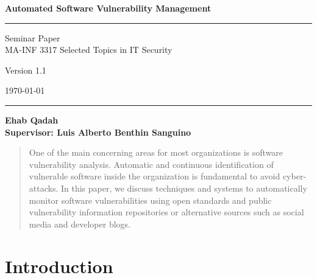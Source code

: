 \documentclass{llncs}
\begin{document}
\begin{flushleft}
 
 \thispagestyle{empty}
\centering\LARGE {\bf Automated Software Vulnerability Management}


\rule{\textwidth}{1pt}

\vspace{2pt}


\centering
 Seminar Paper  
 \\MA-INF 3317 Selected Topics in IT Security

{\Large Version 1.1 }

\vspace{8pt}
\today

\rule{\textwidth}{1pt}

\vspace{8 cm}

\centering
 \bf Ehab Qadah\\
 
 \vspace{7 pt}
\bf Supervisor: Luis Alberto Benthin Sanguino

\end{flushleft}


\newpage

\tableofcontents

\newpage


\begin{abstract}
One of the main concerning areas for most organizations is software vulnerability analysis. Automatic and continuous identification of vulnerable software inside the organization is fundamental to avoid cyber-attacks. In this paper, we discuss techniques and systems to automatically monitor software vulnerabilities using open standards and public vulnerability information repositories or alternative sources such as social media and developer blogs. 
\end{abstract}

\section{Introduction}
\end{document}
